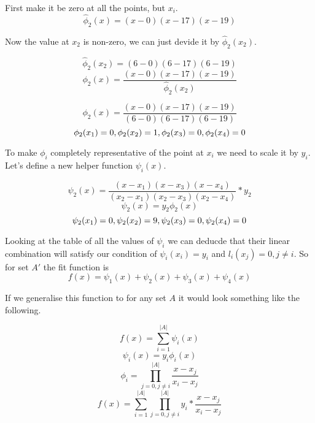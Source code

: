 \documentclass[12pt, titlepage]{article}
\begin{document}
First make it be zero at all the points, but $x_i$.
\begin{equation}
    \hat{\phi}_2(x) = (x - 0)(x - 17)(x - 19)
\end{equation}

Now the value at $x_2$ is non-zero, we can just devide it by $\hat{\phi}_2(x_2)$.

\begin{equation}
    \hat{\phi}_2(x_2) = (6 - 0)(6 - 17)(6 - 19)
\end{equation}
\begin{equation}
    \phi_2(x) = \frac{(x - 0)(x - 17)(x - 19)}{\hat{\phi}_2(x_2)}
\end{equation}

\begin{equation}
    \phi_2(x) = \frac{(x - 0)(x - 17)(x - 19)}{(6 - 0)(6 - 17)(6 - 19)}
\end{equation}
$$\phi_2(x_1) = 0, \phi_2(x_2) = 1\\,\phi_2(x_3) = 0\\, \phi_2(x_4) = 0\\$$

To make $\phi_i$ completely representative of the point at $x_i$ we need to 
scale it by $y_i$. Let's define a new helper function $\psi_i(x)$.

\begin{equation}
    \psi_2(x) = \frac{(x - x_1)(x - x_3)(x - x_4)}{(x_2 - x_1)(x_2 - x_3)(x_2 - x_4)} * y_2
\end{equation}
\begin{equation}
    \psi_2(x) = y_2 \phi_2(x)
\end{equation}
$$\psi_2(x_1) = 0, \psi_2(x_2) = 9\\,\psi_2(x_3) = 0\\, \psi_2(x_4) = 0\\$$

Looking at the table of all the values of $\psi_i$ we can deducde that their linear
combination will satisfy our condition of $\psi_i(x_i) = y_i$ and 
$l_i(x_j) = 0, j \neq i$. So for set $A'$ the fit function is 
$$f(x) = \psi_1(x) + \psi_2(x) + \psi_3(x) + \psi_4(x)$$

If we generalise this function to for any set $A$ it would look something 
like the following.

$$f(x) = \sum_{i=1}^{|A|}\psi_i(x)$$
$$\psi_i(x) = y_i \phi_i(x)$$
\begin{equation}
    \phi_i = \prod_{j=0, j \neq i}^{|A|}\frac{x - x_j}{x_i - x_j}
\end{equation}
\begin{equation}
f(x) = \sum_{i=1}^{|A|} \prod_{j=0, j \neq i}^{|A|}y_i * \frac{x - x_j}{x_i - x_j}
\end{equation}
\end{document}
